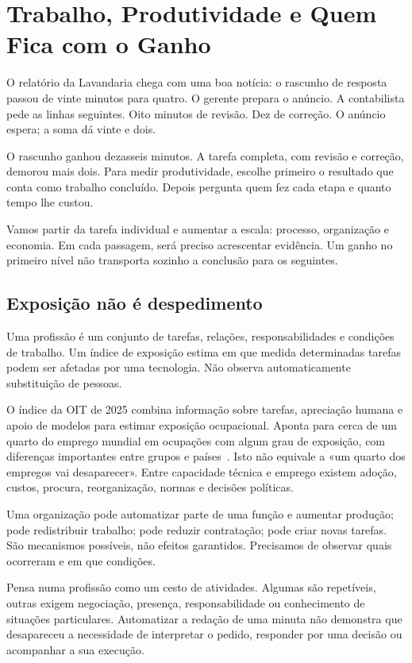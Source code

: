 \chapter{Trabalho, Produtividade e Quem Fica com o Ganho}
\label{ch:trabalho}

\ficcao O relatório da Lavandaria chega com uma boa notícia: o rascunho de resposta passou de vinte minutos para quatro. O gerente prepara o anúncio. A contabilista pede as linhas seguintes. Oito minutos de revisão. Dez de correção. O anúncio espera; a soma dá vinte e dois.

O rascunho ganhou dezasseis minutos. A tarefa completa, com revisão e correção, demorou mais dois. Para medir produtividade, escolhe primeiro o resultado que conta como trabalho concluído. Depois pergunta quem fez cada etapa e quanto tempo lhe custou.

Vamos partir da tarefa individual e aumentar a escala: processo, organização e economia. Em cada passagem, será preciso acrescentar evidência. Um ganho no primeiro nível não transporta sozinho a conclusão para os seguintes.

\section{Exposição não é despedimento}
Uma profissão é um conjunto de tarefas, relações, responsabilidades e condições de trabalho. Um índice de exposição estima em que medida determinadas tarefas podem ser afetadas por uma tecnologia. Não observa automaticamente substituição de pessoas.

O índice da OIT de 2025 combina informação sobre tarefas, apreciação humana e apoio de modelos para estimar exposição ocupacional. Aponta para cerca de um quarto do emprego mundial em ocupações com algum grau de exposição, com diferenças importantes entre grupos e países~\citep{ilo2025}. Isto não equivale a «um quarto dos empregos vai desaparecer». Entre capacidade técnica e emprego existem adoção, custos, procura, reorganização, normas e decisões políticas.

Uma organização pode automatizar parte de uma função e aumentar produção; pode redistribuir trabalho; pode reduzir contratação; pode criar novas tarefas. São mecanismos possíveis, não efeitos garantidos. Precisamos de observar quais ocorreram e em que condições.

Pensa numa profissão como um cesto de atividades. Algumas são repetíveis, outras exigem negociação, presença, responsabilidade ou conhecimento de situações particulares. Automatizar a redação de uma minuta não demonstra que desapareceu a necessidade de interpretar o pedido, responder por uma decisão ou acompanhar a sua execução.

